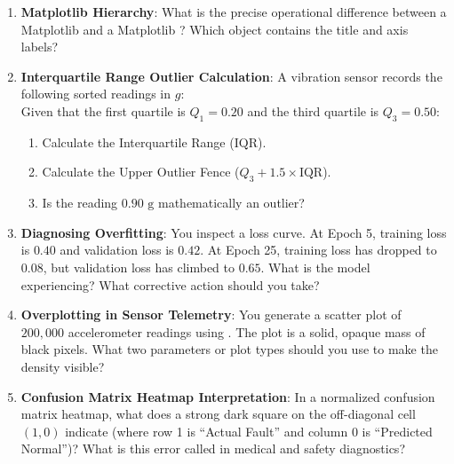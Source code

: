 \begin{enumerate}
    \item \textbf{Matplotlib Hierarchy}: What is the precise operational difference between a Matplotlib  and a Matplotlib ? Which object contains the title and axis labels?

    \item \textbf{Interquartile Range Outlier Calculation}: A vibration sensor records the following sorted readings in $g$:
    \begin{equation*}
    [0.10, \quad 0.20, \quad 0.25, \quad 0.30, \quad 0.40, \quad 0.50, \quad 0.90]
    \end{equation*}
    Given that the first quartile is $Q_1 = 0.20$ and the third quartile is $Q_3 = 0.50$:
    \begin{enumerate}[label=(\alph*)]
        \item Calculate the Interquartile Range ($\text{IQR}$).
        \item Calculate the Upper Outlier Fence ($Q_3 + 1.5 \times \text{IQR}$).
        \item Is the reading $0.90\text{ g}$ mathematically an outlier?
    \end{enumerate}

    \item \textbf{Diagnosing Overfitting}: You inspect a loss curve. At Epoch 5, training loss is $0.40$ and validation loss is $0.42$. At Epoch 25, training loss has dropped to $0.08$, but validation loss has climbed to $0.65$. What is the model experiencing? What corrective action should you take?

    \item \textbf{Overplotting in Sensor Telemetry}: You generate a scatter plot of $200{,}000$ accelerometer readings using . The plot is a solid, opaque mass of black pixels. What two parameters or plot types should you use to make the density visible?

    \item \textbf{Confusion Matrix Heatmap Interpretation}: In a normalized confusion matrix heatmap, what does a strong dark square on the off-diagonal cell $(1, 0)$ indicate (where row 1 is ``Actual Fault'' and column 0 is ``Predicted Normal'')? What is this error called in medical and safety diagnostics?
\end{enumerate}

